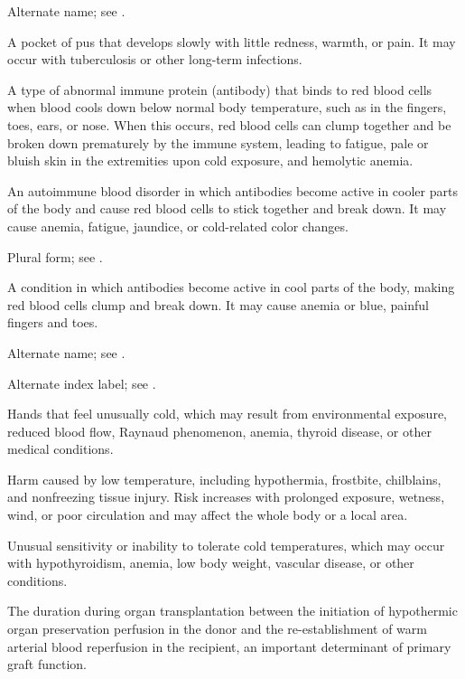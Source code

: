  Alternate name; see .

 A pocket of pus that develops slowly with little redness, warmth, or pain. It may occur with tuberculosis or other long-term infections.

 A type of abnormal immune protein (antibody) that binds to red blood cells when blood cools down below normal body temperature, such as in the fingers, toes, ears, or nose. When this occurs, red blood cells can clump together and be broken down prematurely by the immune system, leading to fatigue, pale or bluish skin in the extremities upon cold exposure, and hemolytic anemia.

 An autoimmune blood disorder in which antibodies become active in cooler parts of the body and cause red blood cells to stick together and break down. It may cause anemia, fatigue, jaundice, or cold-related color changes.

 Plural form; see .

 A condition in which antibodies become active in cool parts of the body, making red blood cells clump and break down. It may cause anemia or blue, painful fingers and toes.

 Alternate name; see .

 Alternate index label; see .

 Hands that feel unusually cold, which may result from environmental exposure, reduced blood flow, Raynaud phenomenon, anemia, thyroid disease, or other medical conditions.

 Harm caused by low temperature, including hypothermia, frostbite, chilblains, and nonfreezing tissue injury. Risk increases with prolonged exposure, wetness, wind, or poor circulation and may affect the whole body or a local area.

 Unusual sensitivity or inability to tolerate cold temperatures, which may occur with hypothyroidism, anemia, low body weight, vascular disease, or other conditions.

 The duration during organ transplantation between the initiation of hypothermic organ preservation perfusion in the donor and the re-establishment of warm arterial blood reperfusion in the recipient, an important determinant of primary graft function.

